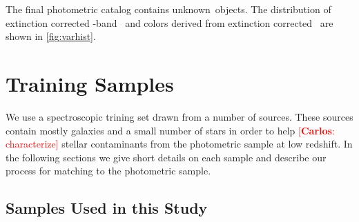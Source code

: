 \documentclass[preprint]{aastex}
\newcommand{\nphoto}{unknown}
\newcommand{\cc}[1]{\textcolor{red}{[{\bf Carlos}: #1]}}
\begin{document}
The final photometric catalog contains \nphoto\ objects.  The distribution of
extinction corrected \rmag-band \cmodelmag\ and colors derived from extinction
corrected \modelmag\ are shown in \ref{fig:varhist}.

\section{Training Samples} \label{sec:train}

We use a spectroscopic trining set drawn from a number of sources. These
sources contain mostly galaxies and a small number of stars in order
to help \cc{characterize} stellar contaminants from the photometric sample at low
redshift. In the following sections we give short details on each sample
and describe our process for matching to the photometric sample.

\subsection{Samples Used in this Study} \label{sec:train:def}
\end{document}
